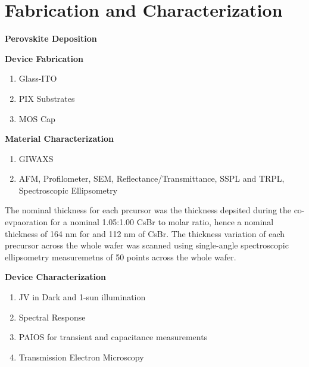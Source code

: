 \chapter{Fabrication and Characterization}\label{ch:appendixA}


\textbf{Perovskite Deposition}

\textbf{Device Fabrication}
\begin{enumerate}
    \item Glass-ITO
    \item PIX Substrates 
    \item MOS Cap
\end{enumerate}


\textbf{Material Characterization}

\begin{enumerate}
    \item GIWAXS
    \item AFM, Profilometer, SEM, Reflectance/Transmittance, SSPL and TRPL, Spectroscopic Ellipsometry
\end{enumerate}

The nominal thickness for each prcursor was the thickness depsited during the co-evpaoration for a nominal 1.05:1.00 CsBr to  molar ratio, hence a nominal thickness of 164 nm for and 112 nm of CsBr. The thickness variation of each precursor across the whole wafer was scanned using single-angle spectroscopic ellipsometry measuremetns of 50 points across the whole wafer.

\textbf{Device Characterization}

\begin{enumerate}
    \item JV in Dark and 1-sun illumination
    \item Spectral Response 
    \item PAIOS for transient and capacitance measurements 
    \item Transmission Electron Microscopy 
\end{enumerate}



\cleardoublepage

